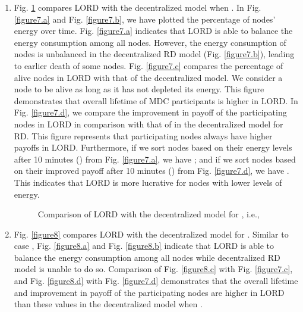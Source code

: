 \documentclass[journal,12pt, onecolumn]{IEEEtran}
\begin{document}
\begin{enumerate}
\item Fig. \ref{figure7} compares LORD with the decentralized model when . In Fig. \ref{figure7.a} and Fig. \ref{figure7.b}, we have plotted the percentage of nodes' energy over time. Fig. \ref{figure7.a} indicates that LORD is able to balance the energy consumption among all nodes. However, the energy consumption of nodes is unbalanced in the decentralized RD model (Fig. \ref{figure7.b}), leading to earlier death of some nodes. Fig. \ref{figure7.c} compares the percentage of alive nodes in LORD with that of the decentralized model. We consider
a node to be alive as long as it has not depleted its energy.
This figure demonstrates that overall lifetime of MDC participants is higher in LORD. In Fig. \ref{figure7.d}, we compare the improvement in payoff of the participating nodes in LORD in comparison with that of in the decentralized model for RD. This figure represents that participating nodes always have higher payoffs in LORD. Furthermore, if we sort nodes based on their energy levels after 10 minutes () from Fig. \ref{figure7.a}, we have ; and if we sort nodes based on their improved payoff after 10 minutes () from Fig. \ref{figure7.d}, we have . This indicates that LORD is more lucrative for nodes with lower levels of energy.

\begin{figure}\centering
 \caption{Comparison of LORD with the decentralized model for , i.e., }
\label{figure7}
\end{figure}

\item Fig. \ref{figure8} compares LORD with the decentralized model for . Similar to case , Fig. \ref{figure8.a} and Fig. \ref{figure8.b} indicate that LORD is able to balance the energy consumption among all nodes while decentralized RD model is unable to do so. Comparison of Fig. \ref{figure8.c} with Fig. \ref{figure7.c}, and Fig. \ref{figure8.d} with Fig. \ref{figure7.d} demonstrates that the overall lifetime and improvement in payoff of the participating nodes are higher in LORD than these values in the decentralized model when . 



\end{enumerate}
\end{document}
